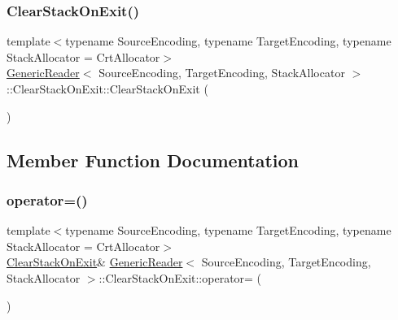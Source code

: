 \subsubsection{\texorpdfstring{Clear\+Stack\+On\+Exit()}{ClearStackOnExit()}\hspace{0.1cm}{\footnotesize\ttfamily [2/2]}}
{\footnotesize\ttfamily template$<$typename Source\+Encoding, typename Target\+Encoding, typename Stack\+Allocator = Crt\+Allocator$>$ \\
\hyperlink{classGenericReader}{Generic\+Reader}$<$ Source\+Encoding, Target\+Encoding, Stack\+Allocator $>$\+::Clear\+Stack\+On\+Exit\+::\+Clear\+Stack\+On\+Exit (\begin{DoxyParamCaption}\item[{const \hyperlink{structGenericReader_1_1ClearStackOnExit}{Clear\+Stack\+On\+Exit} \&}]{ }\end{DoxyParamCaption})\hspace{0.3cm}{\ttfamily [private]}}



\subsection{Member Function Documentation}
\mbox{\label{structGenericReader_1_1ClearStackOnExit_acf3f83e842ebbe256c86d52e36a044c3}} 
\subsubsection{\texorpdfstring{operator=()}{operator=()}}
{\footnotesize\ttfamily template$<$typename Source\+Encoding, typename Target\+Encoding, typename Stack\+Allocator = Crt\+Allocator$>$ \\
\hyperlink{structGenericReader_1_1ClearStackOnExit}{Clear\+Stack\+On\+Exit}\& \hyperlink{classGenericReader}{Generic\+Reader}$<$ Source\+Encoding, Target\+Encoding, Stack\+Allocator $>$\+::Clear\+Stack\+On\+Exit\+::operator= (\begin{DoxyParamCaption}\item[{const \hyperlink{structGenericReader_1_1ClearStackOnExit}{Clear\+Stack\+On\+Exit} \&}]{ }\end{DoxyParamCaption})\hspace{0.3cm}{\ttfamily [private]}}



